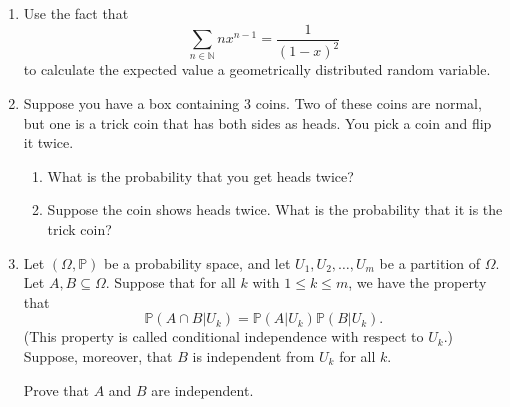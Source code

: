 \documentclass[12pt]{article}
\newcommand{\N}{\mathbb{N}}
\renewcommand{\P}{\mathbb{P}}
\newcommand{\p}[1]{\P\left(#1\right)}
\begin{document}
\begin{enumerate}
\item Use the fact that 
\[\sum_{n\in\N} nx^{n-1} = \frac{1}{(1-x)^2}\]
to calculate the expected value a geometrically distributed random variable.

\item Suppose you have a box containing 3 coins. Two of these coins are normal, but one is a trick coin that has both sides as heads. You pick a coin and flip it twice.
\begin{enumerate}
\item What is the probability that you get heads twice?
\item Suppose the coin shows heads twice. What is the probability that it is the trick coin?
\end{enumerate}

\item Let $(\Omega, \P)$ be a probability space, and let $U_1, U_2, \dots, U_m$ be a partition of $\Omega$. Let $A, B\subseteq \Omega$. Suppose that for all $k$ with $1\leq k\leq m$, we have the property that
\[\p{A\cap B\vert U_k} = \p{A\vert U_k}\p{B\vert U_k}.\]
(This property is called conditional independence with respect to $U_k$.) Suppose, moreover, that $B$ is independent from $U_k$ for all $k$.

Prove that $A$ and $B$ are independent.
\end{enumerate}
\end{document}
